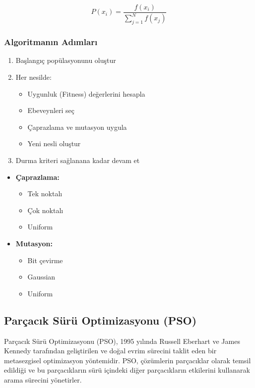 \begin{equation}
P(x_i) = \frac{f(x_i)}{\sum_{j=1}^N f(x_j)}
\end{equation}


\subsubsection{Algoritmanın Adımları}
\begin{enumerate}
    \item Başlangıç popülasyonunu oluştur
    \item Her nesilde:
        \begin{itemize}
            \item Uygunluk (Fitness) değerlerini hesapla
            \item Ebeveynleri seç
            \item Çaprazlama ve mutasyon uygula
            \item Yeni nesli oluştur
        \end{itemize}
    \item Durma kriteri sağlanana kadar devam et
\end{enumerate}

\begin{tcolorbox}[title=Genetik Operatörler]
\begin{itemize}
    \item \textbf{Çaprazlama:}
        \begin{itemize}
            \item Tek noktalı
            \item Çok noktalı
            \item Uniform
        \end{itemize}
    \item \textbf{Mutasyon:}
        \begin{itemize}
            \item Bit çevirme
            \item Gaussian
            \item Uniform
        \end{itemize}
\end{itemize}
\end{tcolorbox}

\subsection{Parçacık Sürü Optimizasyonu (PSO)}
Parçacık Sürü Optimizasyonu (PSO), 1995 yılında Russell Eberhart ve James Kennedy tarafından geliştirilen ve doğal evrim sürecini taklit eden bir metasezgisel optimizasyon yöntemidir. PSO, çözümlerin parçacıklar olarak temsil edildiği ve bu parçacıkların sürü içindeki diğer parçacıkların etkilerini kullanarak arama sürecini yönetirler.

